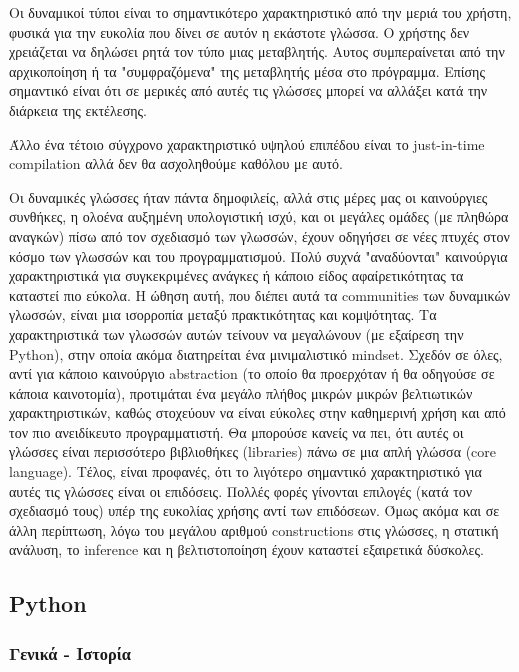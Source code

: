 Οι δυναμικοί τύποι είναι το σημαντικότερο χαρακτηριστικό από την μεριά του
χρήστη, φυσικά για την ευκολία που δίνει σε αυτόν η εκάστοτε γλώσσα. Ο χρήστης
δεν χρειάζεται να δηλώσει ρητά τον τύπο μιας μεταβλητής. Αυτος συμπεραίνεται από
την αρχικοποίηση ή τα "συμφραζόμενα" της μεταβλητής μέσα στο πρόγραμμα. Επίσης
σημαντικό είναι ότι σε μερικές από αυτές τις γλώσσες μπορεί να αλλάξει κατά την
διάρκεια της εκτέλεσης.

Άλλο ένα τέτοιο σύγχρονο χαρακτηριστικό υψηλού επιπέδου είναι το just-in-time
compilation αλλά δεν θα ασχοληθούμε καθόλου με αυτό.

Οι δυναμικές γλώσσες ήταν πάντα δημοφιλείς, αλλά στις μέρες μας οι καινούργιες
συνθήκες, η ολοένα αυξημένη υπολογιστική ισχύ, και οι μεγάλες ομάδες (με πληθώρα
αναγκών) πίσω από τον σχεδιασμό των γλωσσών, έχουν οδηγήσει σε νέες  πτυχές στον
κόσμο των γλωσσών και του προγραμματισμού. Πολύ συχνά "αναδύονται" καινούργια
χαρακτηριστικά για συγκεκριμένες ανάγκες ή κάποιο είδος  αφαίρετικότητας τα
καταστεί πιο εύκολα. Η ώθηση αυτή, που διέπει αυτά τα  communities των δυναμικών
γλωσσών, είναι μια ισορροπία μεταξύ πρακτικότητας και κομψότητας. Τα
χαρακτηριστικά των γλωσσών αυτών τείνουν να μεγαλώνουν (με  εξαίρεση την
Python), στην οποία ακόμα διατηρείται ένα μινιμαλιστικό mindset. Σχεδόν σε όλες,
αντί για κάποιο καινούργιο abstraction (το οποίο θα προερχόταν  ή θα οδηγούσε σε
κάποια καινοτομία), προτιμάται ένα μεγάλο πλήθος μικρών μικρών  βελτιωτικών
χαρακτηριστικών, καθώς στοχεύουν να είναι εύκολες στην καθημερινή  χρήση και από
τον πιο ανειδίκευτο προγραμματιστή. Θα μπορούσε κανείς να πει,  ότι αυτές οι
γλώσσες είναι περισσότερο βιβλιοθήκες (libraries) πάνω σε μια απλή  γλώσσα (core
language). Τέλος, είναι προφανές, ότι το λιγότερο σημαντικό  χαρακτηριστικό για
αυτές τις γλώσσες είναι οι επιδόσεις. Πολλές φορές γίνονται  επιλογές (κατά τον
σχεδιασμό τους) υπέρ της ευκολίας χρήσης αντί των επιδόσεων. Όμως ακόμα και σε
άλλη περίπτωση, λόγω του μεγάλου αριθμού constructions στις  γλώσσες, η στατική
ανάλυση, το inference και η βελτιστοποίηση έχουν καταστεί  εξαιρετικά δύσκολες.


\subsection{Python}

\subsubsection{Γενικά - Ιστορία}

